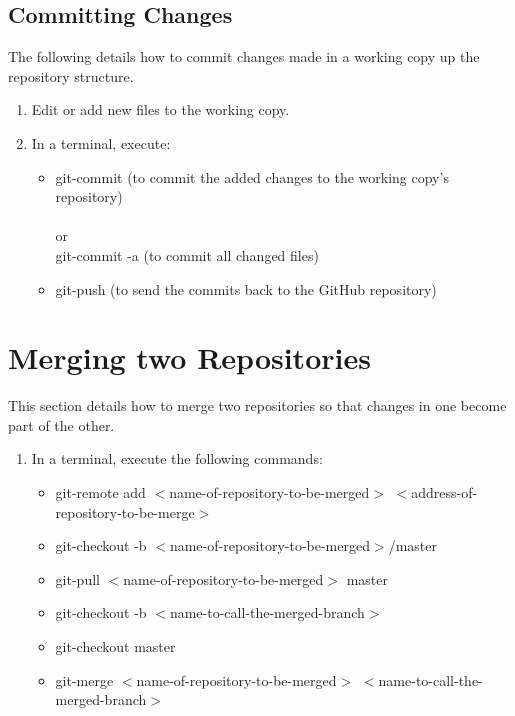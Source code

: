 \documentclass{article}
\begin{document}
\subsection{Committing Changes}
\label{committing}
The following details how to commit changes made in a working copy up the repository structure.
\begin{enumerate}
	\item Edit or add new files to the working copy.
	\item In a terminal, execute:
	\begin{itemize}
		\item git-commit (to commit the added changes to the working copy's repository)\\
		\\
		or
		\\ git-commit -a (to commit all changed files)
		\item git-push (to send the commits back to the GitHub repository)
	\end{itemize}
\end{enumerate}

\section{Merging two Repositories}
\label{merging}
This section details how to merge two repositories so that changes in one become part of the other.
\begin{enumerate}
	\item In a terminal, execute the following commands:
	\begin{itemize}
		\item git-remote add \(<\)name-of-repository-to-be-merged\(>\) \(<\)address-of-repository-to-be-merge\(>\)
		\item git-checkout -b \(<\)name-of-repository-to-be-merged\(>\)/master
		\item git-pull \(<\)name-of-repository-to-be-merged\(>\) master
		\item git-checkout -b \(<\)name-to-call-the-merged-branch\(>\)
		\item git-checkout master
		\item git-merge \(<\)name-of-repository-to-be-merged\(>\) \(<\)name-to-call-the-merged-branch\(>\)
	\end{itemize}
\end{enumerate}
\end{document}
